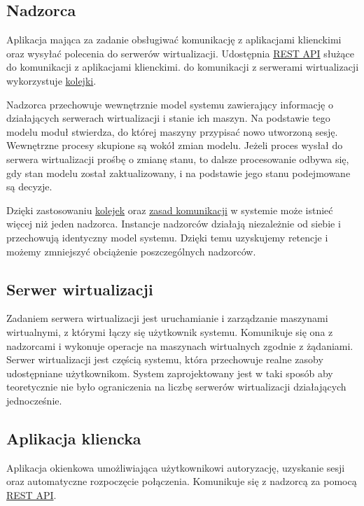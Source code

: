 \documentclass[../deliverable-two.tex]{subfiles}
\begin{document}
\label{modules}

\subsection{Nadzorca}

Aplikacja mająca za zadanie obsługiwać komunikację z aplikacjami klienckimi oraz wysyłać polecenia do serwerów wirtualizacji. Udostępnia \hyperref[communication:api]{REST API} służące do komunikacji z aplikacjami klienckimi. do komunikacji z serwerami wirtualizacji wykorzystuje \hyperref[external-modules:broker]{kolejki}.

Nadzorca przechowuje wewnętrznie model systemu zawierający informację o działających serwerach wirtualizacji i stanie ich maszyn. Na podstawie tego modelu moduł stwierdza, do której maszyny przypisać nowo utworzoną sesję. Wewnętrzne procesy skupione są wokół zmian modelu. Jeżeli proces wysłał do serwera wirtualizacji prośbę o zmianę stanu, to dalsze procesowanie odbywa się, gdy stan modelu został zaktualizowany, i na podstawie jego stanu podejmowane są decyzje.

Dzięki zastosowaniu \hyperref[external-modules:broker]{kolejek} oraz \hyperref[communication:broker]{zasad komunikacji} w systemie może istnieć więcej niż jeden nadzorca. Instancje nadzorców działają niezależnie od siebie i przechowują identyczny model systemu. Dzięki temu uzyskujemy retencje i możemy zmniejszyć obciążenie poszczególnych nadzorców.

\subsection{Serwer wirtualizacji}

Zadaniem serwera wirtualizacji jest uruchamianie i zarządzanie maszynami wirtualnymi, z którymi łączy się użytkownik systemu. Komunikuje się ona z nadzorcami i wykonuje operacje na maszynach wirtualnych zgodnie z żądaniami.
Serwer wirtualizacji jest częścią systemu, która przechowuje realne zasoby udostępniane użytkownikom.
System zaprojektowany jest w taki sposób aby teoretycznie nie było ograniczenia na liczbę serwerów wirtualizacji działających jednocześnie.

\subsection{Aplikacja kliencka}

Aplikacja okienkowa umożliwiająca użytkownikowi autoryzację, uzyskanie sesji oraz automatyczne rozpoczęcie połączenia. Komunikuje się z nadzorcą za pomocą \hyperref[communication:api]{REST API}.
\end{document}
